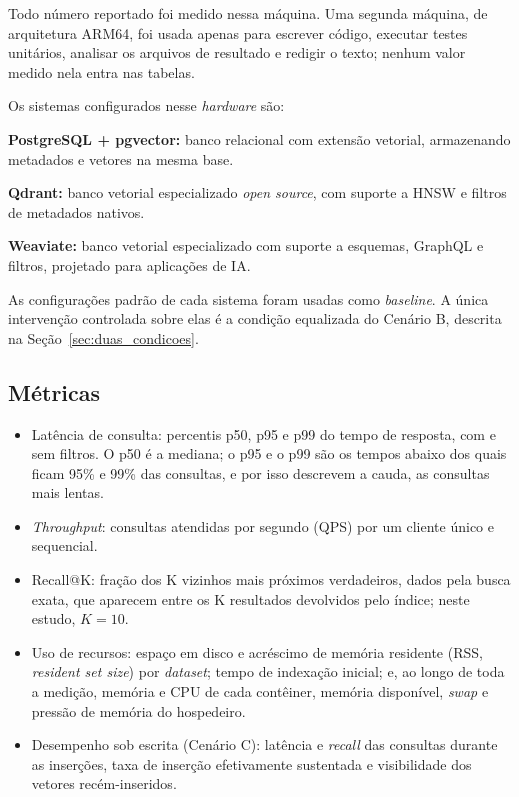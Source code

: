 Todo número reportado foi medido nessa máquina. Uma segunda máquina, de arquitetura ARM64, foi usada apenas para escrever código, executar testes unitários, analisar os arquivos de resultado e redigir o texto; nenhum valor medido nela entra nas tabelas.

Os sistemas configurados nesse \textit{hardware} são:

\textbf{PostgreSQL + pgvector:} banco relacional com extensão vetorial, armazenando metadados e vetores na mesma base.

\textbf{Qdrant:} banco vetorial especializado \textit{open source}, com suporte a HNSW e filtros de metadados nativos.

\textbf{Weaviate:} banco vetorial especializado com suporte a esquemas, GraphQL e filtros, projetado para aplicações de IA.

As configurações padrão de cada sistema foram usadas como \textit{baseline}. A única intervenção controlada sobre elas é a condição equalizada do Cenário B, descrita na Seção~\ref{sec:duas_condicoes}.

\subsection{Métricas}

\begin{itemize}
    \item Latência de consulta: percentis p50, p95 e p99 do tempo de resposta, com e sem filtros. O p50 é a mediana; o p95 e o p99 são os tempos abaixo dos quais ficam 95\% e 99\% das consultas, e por isso descrevem a cauda, as consultas mais lentas.
    \item \textit{Throughput}: consultas atendidas por segundo (QPS) por um cliente único e sequencial.
    \item Recall@K: fração dos K vizinhos mais próximos verdadeiros, dados pela busca exata, que aparecem entre os K resultados devolvidos pelo índice; neste estudo, $K = 10$.
    \item Uso de recursos: espaço em disco e acréscimo de memória residente (RSS, \textit{resident set size}) por \textit{dataset}; tempo de indexação inicial; e, ao longo de toda a medição, memória e CPU de cada contêiner, memória disponível, \textit{swap} e pressão de memória do hospedeiro.
    \item Desempenho sob escrita (Cenário C): latência e \textit{recall} das consultas durante as inserções, taxa de inserção efetivamente sustentada e visibilidade dos vetores recém-inseridos.
\end{itemize}

